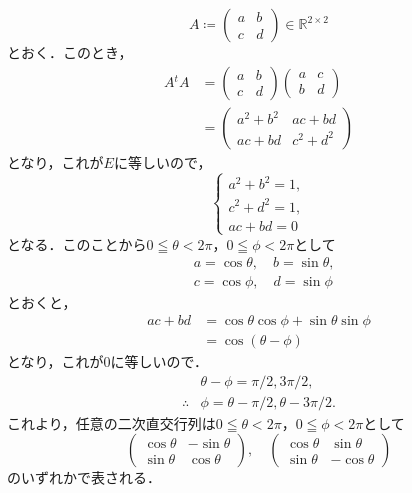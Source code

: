 \documentclass[a4paper,10pt,fleqn]{ltjsarticle}
\begin{document}
\begin{tleftbar}
  \[
    A \coloneqq \begin{pmatrix} a & b \\ c & d\end{pmatrix} \in \mathbb{R}^{2 \times 2}
  \]
  とおく．このとき，
  \begin{align*}
    A {}^t A & = \begin{pmatrix} a & b \\ c & d \end{pmatrix} \begin{pmatrix} a & c \\ b & d\end{pmatrix} \\
             & = \begin{pmatrix} a^2 +b^2 & ac+bd \\ ac+bd & c^2 + d^2 \end{pmatrix}
  \end{align*}
  となり，これが$E$に等しいので，
  \[
    \begin{cases}
      a^2 + b^2 =1 , \\
      c^2 + d^2 =1 , \\
      ac+bd =0
    \end{cases}
  \]
  となる．このことから$ 0 \leqq \theta < 2\pi $，$ 0 \leqq \phi < 2\pi$として
  \begin{align*}
     & a = \cos \theta , \quad b = \sin \theta, \\
     & c = \cos \phi , \quad d = \sin \phi
  \end{align*}
  とおくと，
  \begin{align*}
    ac+bd & = \cos \theta \cos \phi + \sin \theta \sin \phi \\
          & = \cos (\theta - \phi)
  \end{align*}
  となり，これが$0$に等しいので．
  \begin{align*}
               & \theta -\phi = \pi /2 , 3\pi /2 ,         \\
    \therefore & \phi = \theta - \pi /2 , \theta - 3\pi/2.
  \end{align*}
  これより，任意の二次直交行列は$ 0 \leqq \theta < 2\pi $，$ 0 \leqq \phi < 2\pi$として
  \[
    \begin{pmatrix} \cos \theta & -\sin \theta \\ \sin \theta & \cos \theta \end{pmatrix},\quad \begin{pmatrix} \cos \theta & \sin \theta \\ \sin \theta & -\cos \theta \end{pmatrix}
  \]
  のいずれかで表される．
\end{tleftbar}
\end{document}
